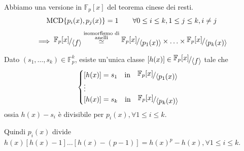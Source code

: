 \documentclass[../main.tex]{subfiles}
\begin{document}
Abbiamo una versione in $\mathbb{F}_p[x]$ del teorema cinese dei resti.
\begin{equation*}
    \operatorname{MCD}\{ p_i(x), p_j(x)\} = 1 \qquad \forall 0 \leq i \leq k, 1 \leq j \leq k, i \neq j
\end{equation*}
\begin{align*}
    \implies \nicefrac{\mathbb{F}_p[x]}{\langle f\rangle} \overset{\substack{\text{isomorfismo di} \\\text{anelli}}}{\simeq} \nicefrac{\mathbb{F}_p[x]}{\langle p_1(x)\rangle} \times \ldots \times \nicefrac{\mathbb{F}_p[x]}{\langle p_k(x)\rangle}
\end{align*}

Dato $(s_1, \ldots, s_k) \in \mathbb{F}_p^k$, esiste un'unica classe $[h(x)] \in \nicefrac{\mathbb{F}_p[x]}{\langle f \rangle}$ tale che
\begin{equation*}
    \begin{cases}
        [h(x)] = s_1 \quad \text{in} \quad \nicefrac{\mathbb{F}_p[x]}{\langle p_1(x)\rangle} \\
        \vdots                                                                               \\
        [h(x)] = s_k \quad \text{in} \quad \nicefrac{\mathbb{F}_p[x]}{\langle p_k(x)\rangle}
    \end{cases}
\end{equation*}
ossia $h(x) - s_i$ è divisibile per $p_i(x), \forall 1 \leq i \leq k$.

Quindi $p_i(x)$ divide $h(x)[h(x) - 1] \ldots [h(x) - (p - 1)] = h(x)^p - h(x), \forall 1 \leq i \leq k$.
\end{document}
